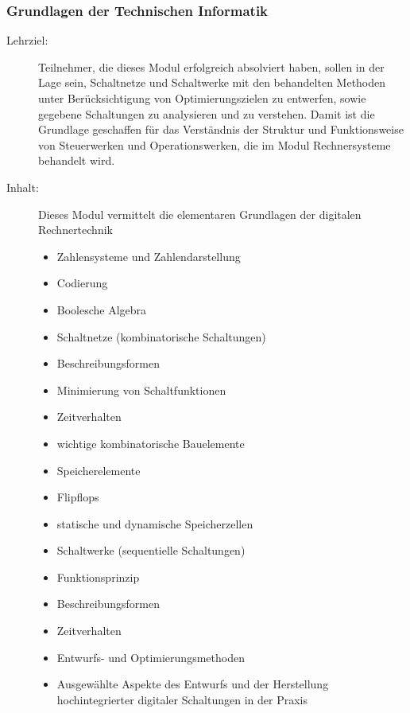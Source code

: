 \documentclass[%
a4paper, %
11pt,               %
leqno,              %
fleqn,              %
]
{scrartcl}
\begin{document}

\subsubsection{Grundlagen der Technischen Informatik} %
\label{ssub:Grundlagen der Technischen Informatik}

\begin{description}
  \item[Lehrziel:] Teilnehmer, die dieses Modul erfolgreich absolviert haben,
    sollen in der Lage sein, Schaltnetze und Schaltwerke mit den behandelten
    Methoden unter Berücksichtigung von Optimierungszielen zu entwerfen, sowie
    gegebene Schaltungen zu analysieren und zu verstehen. Damit ist die
    Grundlage geschaffen für das Verständnis der Struktur und Funktionsweise von
    Steuerwerken und Operationswerken, die im Modul Rechnersysteme behandelt
    wird.
  \item[Inhalt:] Dieses Modul vermittelt die elementaren Grundlagen der
    digitalen Rechnertechnik
  \begin{itemize}\itemsep0pt
    \item Zahlensysteme und Zahlendarstellung
    \item Codierung
    \item Boolesche Algebra
    \item Schaltnetze (kombinatorische Schaltungen)
    \item Beschreibungsformen
    \item Minimierung von Schaltfunktionen
    \item Zeitverhalten
    \item wichtige kombinatorische Bauelemente
    \item Speicherelemente
    \item Flipflops
    \item statische und dynamische Speicherzellen
    \item Schaltwerke (sequentielle Schaltungen)
    \item Funktionsprinzip
    \item Beschreibungsformen
    \item Zeitverhalten
    \item Entwurfs- und Optimierungsmethoden
    \item Ausgewählte Aspekte des Entwurfs und der Herstellung hochintegrierter
      digitaler Schaltungen in der Praxis
  \end{itemize}
\end{description}
\end{document}
